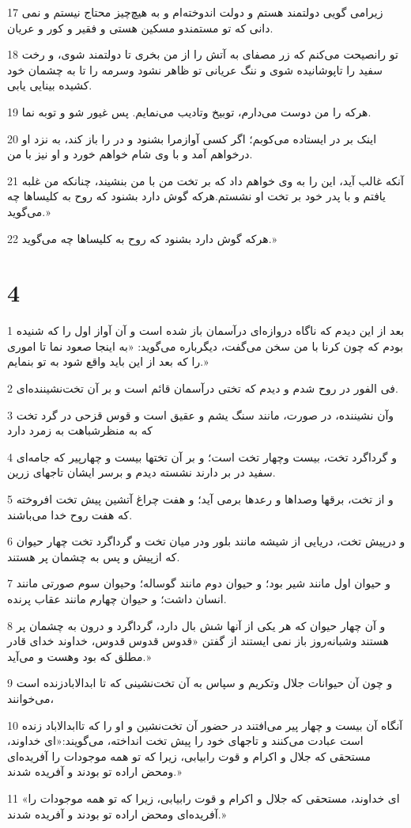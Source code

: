 \par 17 زیرامی گویی دولتمند هستم و دولت اندوخته‌ام و به هیچ‌چیز محتاج نیستم و نمی دانی که تو مستمندو مسکین هستی و فقیر و کور و عریان.
\par 18 تو رانصیحت می‌کنم که زر مصفای به آتش را از من بخری تا دولتمند شوی، و رخت سفید را تاپوشانیده شوی و ننگ عریانی تو ظاهر نشود وسرمه را تا به چشمان خود کشیده بینایی یابی.
\par 19 هر‌که را من دوست می‌دارم، توبیخ وتادیب می‌نمایم. پس غیور شو و توبه نما.
\par 20 اینک بر در ایستاده می‌کوبم؛ اگر کسی آوازمرا بشنود و در را باز کند، به نزد او درخواهم آمد و با وی شام خواهم خورد و او نیز با من.
\par 21 آنکه غالب آید، این را به وی خواهم داد که بر تخت من با من بنشیند، چنانکه من غلبه یافتم و با پدر خود بر تخت او نشستم.هر‌که گوش دارد بشنود که روح به کلیساها چه می‌گوید.»
\par 22 هر‌که گوش دارد بشنود که روح به کلیساها چه می‌گوید.»

\chapter{4}

\par 1 بعد از این دیدم که ناگاه دروازه‌ای درآسمان باز شده است و آن آواز اول را که شنیده بودم که چون کرنا با من سخن می‌گفت، دیگرباره می‌گوید: «به اینجا صعود نما تا اموری را که بعد از این باید واقع شود به تو بنمایم.»
\par 2 فی الفور در روح شدم و دیدم که تختی درآسمان قائم است و بر آن تخت‌نشیننده‌ای.
\par 3 وآن نشیننده، در صورت، مانند سنگ یشم و عقیق است و قوس قزحی در گرد تخت که به منظرشباهت به زمرد دارد
\par 4 و گرداگرد تخت، بیست وچهار تخت است؛ و بر آن تختها بیست و چهارپیر که جامه‌ای سفید در بر دارند نشسته دیدم و برسر ایشان تاجهای زرین.
\par 5 و از تخت، برقها وصداها و رعدها برمی آید؛ و هفت چراغ آتشین پیش تخت افروخته که هفت روح خدا می‌باشند.
\par 6 و در‌پیش تخت، دریایی از شیشه مانند بلور ودر میان تخت و گرداگرد تخت چهار حیوان که ازپیش و پس به چشمان پر هستند.
\par 7 و حیوان اول مانند شیر بود؛ و حیوان دوم مانند گوساله؛ وحیوان سوم صورتی مانند انسان داشت؛ و حیوان چهارم مانند عقاب پرنده.
\par 8 و آن چهار حیوان که هر یکی از آنها شش بال دارد، گرداگرد و درون به چشمان پر هستند وشبانه‌روز باز نمی ایستند از گفتن «قدوس قدوس قدوس، خداوند خدای قادر مطلق که بود وهست و می‌آید.»
\par 9 و چون آن حیوانات جلال وتکریم و سپاس به آن تخت‌نشینی که تا ابدالابادزنده است می‌خوانند،
\par 10 آنگاه آن بیست و چهار پیر می‌افتند در حضور آن تخت‌نشین و او را که تاابدالاباد زنده است عبادت می‌کنند و تاجهای خود را پیش تخت انداخته، می‌گویند:«ای خداوند، مستحقی که جلال و اکرام و قوت رابیابی، زیرا که تو همه موجودات را آفریده‌ای ومحض اراده تو بودند و آفریده شدند.»
\par 11 «ای خداوند، مستحقی که جلال و اکرام و قوت رابیابی، زیرا که تو همه موجودات را آفریده‌ای ومحض اراده تو بودند و آفریده شدند.»

